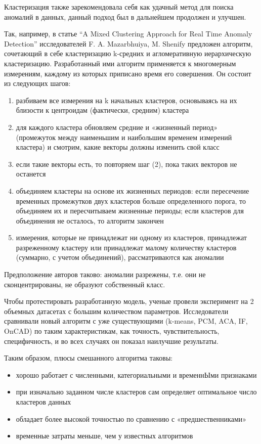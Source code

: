 \documentclass[14pt, letterpaper]{extarticle}
\begin{document}
Кластеризация также зарекомендовала себя как удачный метод для поиска аномалий в данных, данный подход был в дальнейшем продолжен и улучшен. 

Так, например, в статье “A Mixed Clustering Approach for Real Time Anomaly Detection” исследователей F. A. Mazarbhuiya, M. Shenify \cite{mazarbhuiya2023mixed} предложен алгоритм, сочетающий в себе кластеризацию k-средних и агломеративную иерархическую кластеризацию. Разработанный ими алгоритм применяется к многомерным измерениям, каждому из которых приписано время его совершения. Он состоит из следующих шагов:
\begin{enumerate}
    \item разбиваем все измерения на k начальных кластеров, основываясь на их близости к центроидам (фактически, средним) кластера
    \item для каждого кластера обновляем средние и «жизненный период» (промежуток между наименьшим и наибольшим временем измерений кластера) и смотрим, какие векторы должны изменить свой класс
    \item если такие векторы есть, то повторяем шаг (2), пока таких векторов не останется
    \item объединяем кластеры на основе их жизненных периодов: если пересечение временных промежутков двух кластеров больше определенного порога, то объединяем их и пересчитываем жизненные периоды; если кластеров для объединения не осталось, то алгоритм закончен
    \item измерения, которые не принадлежат ни одному из кластеров, принадлежат разреженному кластеру или принадлежат малому количеству кластеров (суммарно, с учетом объединений), рассматриваются как аномалии
\end{enumerate}

Предположение авторов таково: аномалии разрежены, т.е. они не сконцентрированы, не образуют собственный класс.

Чтобы протестировать разработанную модель, ученые провели эксперимент на 2 объемных датасетах с большим количеством параметров. Исследователи сравнивали новый алгоритм с уже существующими (k-means, PCM, ACA, IF, OnCAD) по таким характеристикам, как точность, чувствительность, специфичность, и во всех случаях он показал наилучшие результаты.

Таким образом, плюсы смешанного алгоритма таковы:
\begin{itemize}
    \item хорошо работает с численными, категориальными и временнЫми признаками
    \item при изначально заданном числе кластеров сам определяет оптимальное число кластеров данных
    \item обладает более высокой точностью по сравнению с «предшественниками»
    \item временные затраты меньше, чем у известных алгоритмов
\end{itemize}
\end{document}
